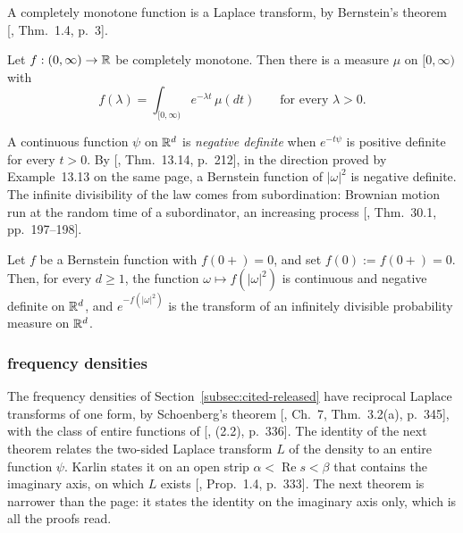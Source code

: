A completely monotone function is a Laplace transform, by Bernstein's theorem
[, Thm.~1.4, p.~3].

\begin{theorem}
\label{thm:cited-A55}

Let $f : (0,\infty) \to \mathbb{R}$ be completely monotone. Then there is a measure $\mu$ on $[0,\infty)$
with
\[
  f(\lambda) = \int_{[0,\infty)}e^{-\lambda t}\,\mu(dt) \qquad\text{for every } \lambda > 0 .
\]
\end{theorem}

A continuous function $\psi$ on $\mathbb{R}^d$ is \emph{negative definite} when $e^{-t\psi}$ is positive
definite for every $t > 0$. By [, Thm.~13.14, p.~212], in the
direction proved by Example~13.13 on the same page, a Bernstein function of $|\omega|^2$ is negative
definite. The infinite divisibility of the law comes from subordination: Brownian motion run at the
random time of a subordinator, an increasing \Levy{} process [, Thm.~30.1,
pp.~197--198].

\begin{theorem}
\label{thm:cited-A57}

Let $f$ be a Bernstein function with $f(0{+}) = 0$, and set $f(0) := f(0{+}) = 0$. Then, for
every $d \ge 1$, the function
$\omega \mapsto f(|\omega|^2)$ is continuous and negative definite on $\mathbb{R}^d$, and
$e^{-f(|\omega|^2)}$ is the transform of an infinitely divisible probability measure on $\mathbb{R}^d$.
\end{theorem}

\subsubsection{\Polya{} frequency densities}
\label{subsec:cited-karlin}

The \Polya{} frequency densities of Section~\ref{subsec:cited-released} have reciprocal Laplace
transforms of one form, by Schoenberg's theorem [, Ch.~7, Thm.~3.2(a),
p.~345], with the class of entire functions of [, (2.2), p.~336]. The
identity of the next theorem relates the two-sided Laplace transform $L$ of the density to an
entire function $\psi$. Karlin states it on an open strip $\alpha < \operatorname{Re}s < \beta$
that contains the imaginary axis, on which $L$ exists [, Prop.~1.4,
p.~333]. The next theorem is narrower than the page: it states the identity on the imaginary axis
only, which is all the proofs read.

